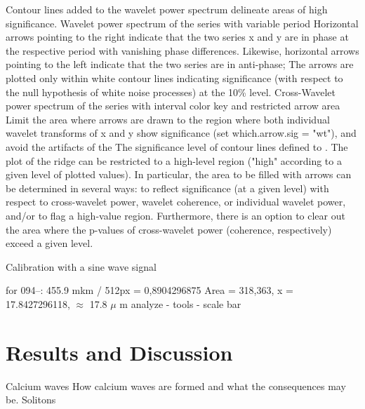 \documentclass{biophys-new}
\begin{document}
Contour lines added to the wavelet power spectrum delineate areas of high significance.
Wavelet power spectrum of the series with variable period
Horizontal arrows pointing to the right indicate that the two series x and y are in phase at the respective period with vanishing phase differences.
Likewise, horizontal arrows pointing to the left indicate that the two series are in anti-phase;
The arrows are plotted only within white contour lines indicating significance (with respect to the null hypothesis of white noise processes) at the 10\% level.
Cross-Wavelet power spectrum of the series with interval color key and restricted arrow area
Limit the area where arrows are drawn to the region where both individual wavelet transforms of x and y show significance (set which.arrow.sig = "wt"), and avoid the artifacts of the
The significance level of contour lines defined to . The plot of the ridge can be restricted to a high-level region ("high" according to a given level of plotted values). In particular, the area to be filled with arrows can be determined in several ways: to reflect significance (at a given level) with respect to cross-wavelet power, wavelet coherence, or individual wavelet power, and/or to flag a high-value region. Furthermore, there is an option to clear out the area where the p-values of cross-wavelet power (coherence, respectively) exceed a given level.

Calibration with a sine wave signal

for 094--: 455.9 mkm / 512px = 0,8904296875
Area = 318,363, x = 17.8427296118, $\approx$ 17.8 $\mu$ m
analyze - tools - scale bar


\section*{Results and Discussion}

Calcium waves
How calcium waves are formed and what the consequences may be.
Solitons
\end{document}
